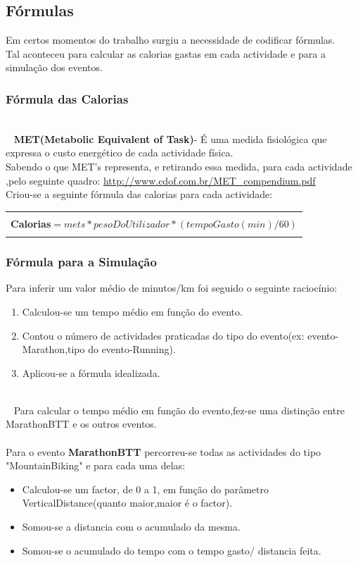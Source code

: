 \documentclass[12pt,notitlepage]{article}
\begin{document}
\subsection{Fórmulas}
Em certos momentos do trabalho surgiu a necessidade de codificar fórmulas.\\
Tal aconteceu para calcular as calorias gastas em cada actividade e para a simulação dos eventos.

\subsubsection{Fórmula das Calorias}
~\\~
\textbf{MET(Metabolic Equivalent of Task)}- É  uma medida fisiológica que expressa o custo energético de cada actividade física.\\
  Sabendo o que MET's representa, e retirando essa medida, para cada actividade ,pelo seguinte quadro: \url{http://www.cdof.com.br/MET_compendium.pdf}\\


Criou-se a seguinte fórmula das calorias para cada actividade:\\

\begin{tabular}{|r|}
  \hline
  \\
 \textbf{Calorias}$=mets * pesoDoUtilizador * (tempoGasto(min) / 60)$\\
 \\
 \hline \hline
\end{tabular}


\subsubsection{Fórmula para a Simulação}

Para inferir um valor médio de minutos/km foi seguido o seguinte raciocínio:\\
\begin{enumerate}
\item Calculou-se um tempo médio em função do evento.
\item Contou o número de actividades praticadas do tipo do evento(ex: evento-Marathon,tipo do evento-Running).
\item Aplicou-se a fórmula idealizada.
\end{enumerate}
~\\~
Para calcular o tempo médio em função do evento,fez-se uma distinção entre MarathonBTT e os outros eventos.\\~\\
Para o evento \textbf{MarathonBTT} percorreu-se todas as actividades do tipo "MountainBiking" e para cada uma delas:
\begin{itemize}
\item Calculou-se um factor, de 0 a 1, em função do parâmetro VerticalDistance(quanto maior,maior é o factor).
\item Somou-se a distancia com o acumulado da mesma.
\item Somou-se o acumulado do tempo com o tempo gasto$/$ distancia feita.
\end{itemize}
\end{document}
